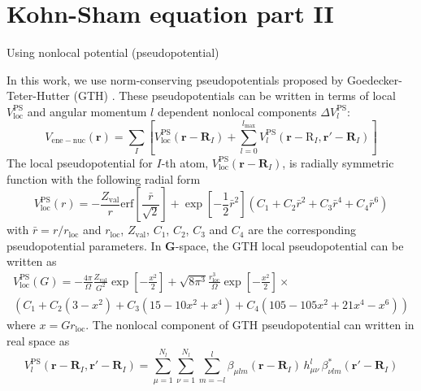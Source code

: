 \chapter{Kohn-Sham equation part II}
\label{chap:ks_part_2}

Using nonlocal potential (pseudopotential)

In this work, we use norm-conserving pseudopotentials proposed
by Goedecker-Teter-Hutter (GTH) \cite{Goedecker1996}.
These pseudopotentials can be written in terms of
local $V^{\mathrm{PS}}_{\mathrm{loc}}$ and
angular momentum $l$ dependent
nonlocal components $\Delta V^{\mathrm{PS}}_{l}$:
\begin{equation}
V_{\mathrm{ene-nuc}}(\mathbf{r}) =
\sum_{I} \left[
V^{\mathrm{PS}}_{\mathrm{loc}}(\mathbf{r}-\mathbf{R}_{I}) +
\sum_{l=0}^{l_{\mathrm{max}}}
V^{\mathrm{PS}}_{l}(\mathbf{r}-\mathrm{R}_{I},\mathbf{r}'-\mathbf{R}_{I})
\right]
\end{equation}
%
The local pseudopotential for
$I$-th atom, $V^{\mathrm{PS}}_{\mathrm{loc}}(\mathbf{r}-\mathbf{R}_{I})$,
is radially symmetric
function with the following radial form
\begin{equation}
V^{\mathrm{PS}}_{\mathrm{loc}}(r) =
-\frac{Z_{\mathrm{val}}}{r}\mathrm{erf}\left[
\frac{\bar{r}}{\sqrt{2}} \right] +
\exp\left[-\frac{1}{2}\bar{r}^2\right]\left(
C_{1} + C_{2}\bar{r}^2 + C_{3}\bar{r}^4 + C_{4}\bar{r}^6
\right)
\label{eq:V_ps_loc_R}
\end{equation}
with $\bar{r}=r/r_{\mathrm{loc}}$ and $r_{\mathrm{loc}}$, $Z_{\mathrm{val}}$,
$C_{1}$, $C_{2}$, $C_{3}$ and $C_{4}$ are the corresponding pseudopotential
parameters.
In $\mathbf{G}$-space, the GTH local pseudopotential can be written as
\begin{multline}
V^{\mathrm{PS}}_{\mathrm{loc}}(G) = -\frac{4\pi}{\Omega}\frac{Z_{\mathrm{val}}}{G^2}
\exp\left[-\frac{x^2}{2}\right] +
\sqrt{8\pi^3} \frac{r^{3}_{\mathrm{loc}}}{\Omega}\exp\left[-\frac{x^2}{2}\right]\times\\
\left( C_{1} + C_{2}(3 - x^2) + C_{3}(15 - 10x^2 + x^4) + C_{4}(105 - 105x^2 + 21x^4 - x^6) \right)
\label{eq:V_ps_loc_G}
\end{multline}
where $x=G r_{\mathrm{loc}}$.
%
The nonlocal component of GTH pseudopotential can written in real space as
\begin{equation}
V^{\mathrm{PS}}_{l}(\mathbf{r}-\mathbf{R}_{I},\mathbf{r}'-\mathbf{R}_{I}) =
\sum_{\mu=1}^{N_{l}} \sum_{\nu=1}^{N_{l}} \sum_{m=-l}^{l}
\beta_{\mu lm}(\mathbf{r}-\mathbf{R}_{I})\,
h^{l}_{\mu\nu}\,
\beta^{*}_{\nu lm}(\mathbf{r}'-\mathbf{R}_{I})
\end{equation}

